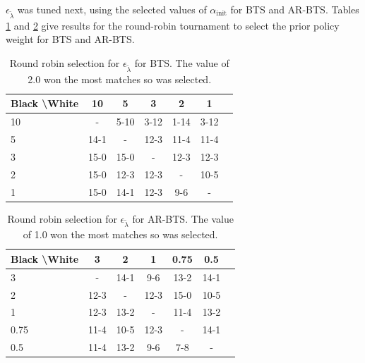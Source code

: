     
    
    
    
    
    $\epsilon_{\tilde{\lambda}}$ was tuned next, using the selected values of $\alpha_{\text{init}}$ for BTS and AR-BTS. Tables \ref{tab:w020} and \ref{tab:x020} give results for the round-robin tournament to select the prior policy weight for BTS and AR-BTS.
    
    \begin{table}[tbp]
    \centering
        \begin{tabular}{l|cccccc}
            \textbf{Black \textbackslash White}     & 10  & 5   & 3   & 2    & 1    \\ 
            \hline
                                    10            & - & 5-10 & 3-12 & 1-14 &  3-12  		\\
                                    5            & 14-1 & - & 12-3 & 11-4 & 11-4   		\\
                                    3          & 15-0 & 15-0 & - & 12-3 & 12-3   		\\
                                    2          & 15-0 & 12-3 & 12-3 & - & 10-5   		\\
                                    1         & 15-0 & 14-1 & 12-3 & 9-6 &   -   	\\    
        \end{tabular}
        \caption[Round robin  selection for $\epsilon_{\tilde{\lambda}}$ for BTS.]{Round robin  selection for $\epsilon_{\tilde{\lambda}}$ for BTS. The value of 2.0 won the most matches so was selected. \label{tab:w020}}
    \end{table}
    
    \begin{table}[tbp]
    \centering
        \begin{tabular}{l|cccccc}
            \textbf{Black \textbackslash White}     & 3  & 2   & 1   & 0.75    & 0.5    \\ 
            \hline
                                    3            & - & 14-1 & 9-6 & 13-2 & 14-1   		\\
                                    2            & 12-3 & - & 12-3 & 15-0 & 10-5   		\\
                                    1          & 12-3 & 13-2 & - & 11-4 & 13-2   		\\
                                    0.75          & 11-4 & 10-5 & 12-3 & - & 14-1   		\\
                                    0.5         & 11-4 & 13-2 & 9-6 & 7-8 &   -   	\\   
        \end{tabular}
        \caption[Round robin  selection for $\epsilon_{\tilde{\lambda}}$ for AR-BTS.]{Round robin  selection for $\epsilon_{\tilde{\lambda}}$ for AR-BTS. The value of 1.0 won the most matches so was selected. \label{tab:x020}}
    \end{table}
    
